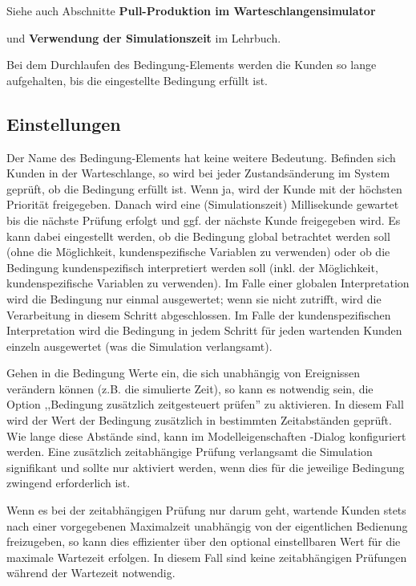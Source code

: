 Siehe auch Abschnitte \textbf{Pull-Produktion im Warteschlangensimulator}

und \textbf{Verwendung der Simulationszeit} im Lehrbuch.

Bei dem Durchlaufen des Bedingung-Elements werden die Kunden so lange aufgehalten, bis die eingestellte Bedingung erfüllt ist. 

\subsection*{Einstellungen}

Der Name des Bedingung-Elements hat keine weitere Bedeutung. Befinden sich Kunden in der Warteschlange, so wird bei jeder Zustandsänderung im System
geprüft, ob die Bedingung erfüllt ist. Wenn ja, wird der Kunde mit der höchsten Priorität freigegeben. Danach wird eine (Simulationszeit) Millisekunde
gewartet bis die nächste Prüfung erfolgt und ggf. der nächste Kunde freigegeben wird. Es kann dabei eingestellt werden, ob die Bedingung global
betrachtet werden soll (ohne die Möglichkeit, kundenspezifische Variablen zu verwenden) oder ob die Bedingung kundenspezifisch interpretiert
werden soll (inkl. der Möglichkeit, kundenspezifische Variablen zu verwenden). Im Falle einer globalen Interpretation wird die Bedingung nur
einmal ausgewertet; wenn sie nicht zutrifft, wird die Verarbeitung in diesem Schritt abgeschlossen. Im Falle der kundenspezifischen Interpretation
wird die Bedingung in jedem Schritt für jeden wartenden Kunden einzeln ausgewertet (was die Simulation verlangsamt).

Gehen in die Bedingung Werte ein, die sich unabhängig von Ereignissen verändern können (z.B. die simulierte Zeit), so kann es notwendig sein,
die Option ,,Bedingung zusätzlich zeitgesteuert prüfen'' zu aktivieren. In diesem Fall wird der Wert der Bedingung zusätzlich in bestimmten
Zeitabständen geprüft. Wie lange diese Abstände sind, kann im Modelleigenschaften -Dialog konfiguriert
werden. Eine zusätzlich zeitabhängige Prüfung verlangsamt die Simulation signifikant und sollte nur aktiviert werden, wenn dies für die
jeweilige Bedingung zwingend erforderlich ist. 

Wenn es bei der zeitabhängigen Prüfung nur darum geht, wartende Kunden stets nach einer vorgegebenen Maximalzeit unabhängig von der eigentlichen
Bedienung freizugeben, so kann dies effizienter über den optional einstellbaren Wert für die maximale Wartezeit erfolgen. In diesem Fall sind
keine zeitabhängigen Prüfungen während der Wartezeit notwendig.


